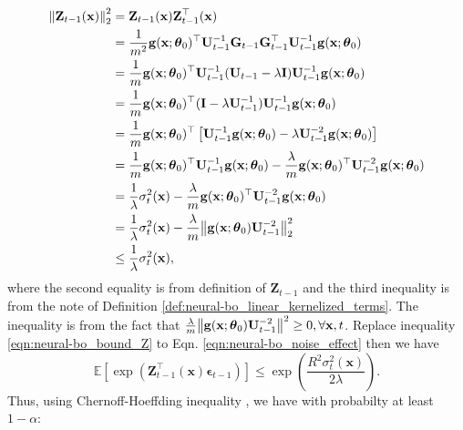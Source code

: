 \begin{align}
        \norm{\mathbf{Z}_{t-1}(\mathbf{x})}^2_2 & = \mathbf{Z}_{t-1}(\mathbf{x}) \mathbf{Z}_{t-1}^\top(\mathbf{x}) \nonumber
\\
        & = \frac{1}{m^2} \mathbf{g}(\mathbf{x}; \boldsymbol{\theta}_0)^\top \mathbf{U}^{-1}_{t-1} \mathbf{G}_{t-1} \mathbf{G}_{t-1}^\top \mathbf{U}^{-1}_{t-1}\mathbf{g}(\mathbf{x}; \boldsymbol{\theta}_0) \nonumber
\\
        & = \frac{1}{m} \mathbf{g}(\mathbf{x}; \boldsymbol{\theta}_0)^\top \mathbf{U}^{-1}_{t-1} (\mathbf{U}_{t-1} - \lambda\mathbf{I}) \mathbf{U}^{-1}_{t-1}\mathbf{g}(\mathbf{x}; \boldsymbol{\theta}_0)  \nonumber
\\
        & = \frac{1}{m}\mathbf{g}(\mathbf{x}; \boldsymbol{\theta}_0)^\top  (\mathbf{I} - \lambda\mathbf{U}^{-1}_{t-1}) \mathbf{U}^{-1}_{t-1} \mathbf{g}(\mathbf{x}; \boldsymbol{\theta}_0) \nonumber
\\
        & = \frac{1}{m} \mathbf{g}(\mathbf{x}; \boldsymbol{\theta}_0)^\top \left[ \mathbf{U}^{-1}_{t-1} \mathbf{g}(\mathbf{x}; \boldsymbol{\theta}_0) - \lambda \mathbf{U}^{-2}_{t-1}\mathbf{g}(\mathbf{x}; \boldsymbol{\theta}_0) \right]  \nonumber
\\ 
        & = \frac{1}{m} \mathbf{g}(\mathbf{x}; \boldsymbol{\theta}_0)^\top \mathbf{U}^{-1}_{t-1} \mathbf{g}(\mathbf{x}; \boldsymbol{\theta}_0) - \frac{\lambda}{m} \mathbf{g}(\mathbf{x}; \boldsymbol{\theta}_0)^\top \mathbf{U}^{-2}_{t-1}\mathbf{g}(\mathbf{x}; \boldsymbol{\theta}_0) \nonumber
\\
        & = \frac{1}{\lambda}\sigma_t^2(\mathbf{x}) - \frac{\lambda}{m} \mathbf{g}(\mathbf{x}; \boldsymbol{\theta}_0)^\top \mathbf{U}^{-2}_{t-1}\mathbf{g}(\mathbf{x}; \boldsymbol{\theta}_0) \nonumber
\\ 
        & = \frac{1}{\lambda}\sigma_t^2(\mathbf{x}) - \frac{\lambda}{m} \norm{\mathbf{g}(\mathbf{x}; \boldsymbol{\theta}_0) \mathbf{U}^{-2}_{t-1}}^2_2  \nonumber
\\
        & \leq \frac{1}{\lambda} \sigma_t^2(\mathbf{x}), \label{eqn:neural-bo_bound_Z}
\end{align}
where the second equality is from definition of $\mathbf{Z}_{t-1}$ and the third inequality is from the note of Definition \ref{def:neural-bo_linear_kernelized_terms}.  The inequality is from the fact that  $\frac{\lambda}{m} \norm{\mathbf{g}(\mathbf{x}; \boldsymbol{\theta}_0) \mathbf{U}^{-2}_{t-1}}^2 \ge 0, \forall \mathbf{x},t$. Replace inequality \eqref{eqn:neural-bo_bound_Z} to Eqn. \eqref{eqn:neural-bo_noise_effect} then we have 
\[ \mathbb E \left[\exp \left( \mathbf{Z}_{t-1}^\top(\mathbf{x})\boldsymbol{\epsilon}_{t-1}   \right) \right] \leq \exp (\frac{R^2\sigma_t^2(\mathbf{x})}{2\lambda}). \]
Thus, using Chernoff-Hoeffding inequality \citep{antonini2008convergence}, we have with probabilty at least $1-\alpha$: 

